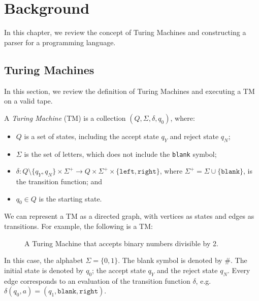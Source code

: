 \chapter{Background}
In this chapter, we review the concept of Turing Machines and constructing a parser for a programming language.

\section{Turing Machines}
In this section, we review the definition of Turing Machines and executing a TM on a valid tape.

A \emph{Turing Machine} (TM) is a collection $(Q, \Sigma, \delta, q_0)$, where:
\begin{itemize}
    \item $Q$ is a set of states, including the accept state $q_Y$ and reject state $q_N$;
    \item $\Sigma$ is the set of letters, which does not include the \texttt{blank} symbol;
    \item $\delta \colon Q \setminus \{q_Y, q_N\} \times \Sigma^+ \to Q \times \Sigma^+ \times \{\texttt{left}, \texttt{right}\}$, where $\Sigma^+ = \Sigma \cup \{\texttt{blank}\}$, is the transition function; and
    \item $q_0 \in Q$ is the starting state.
\end{itemize}
We can represent a TM as a directed graph, with vertices as states and edges as transitions. For example, the following is a TM:
\begin{figure}[H]
    \centering
    \caption{A Turing Machine that accepts binary numbers divisible by 2.}
\end{figure}
\noindent In this case, the alphabet $\Sigma = \{0, 1\}$. The blank symbol is denoted by $\#$. The initial state is denoted by $q_0$; the accept state $q_Y$ and the reject state $q_N$. Every edge corresponds to an evaluation of the transition function $\delta$, e.g. $\delta(q_0, a) = (q_1, \texttt{blank}, \texttt{right})$.

